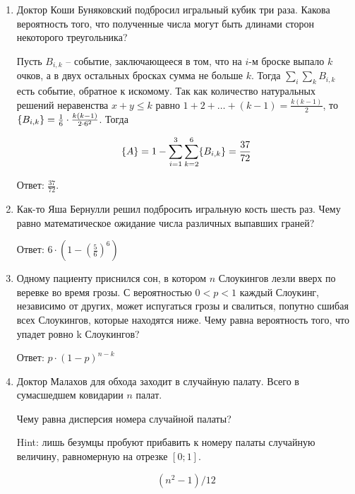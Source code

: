 \documentclass[12pt]{article}
\let\P\relax
\DeclareMathOperator{\P}{\mathbb{P}}
\newenvironment{solution}{}{}
\begin{document}
\begin{enumerate}
    \item Доктор Коши Буняковский подбросил игральный кубик три раза. Какова вероятность того, что полученные числа могут быть длинами сторон некоторого треугольника?

\begin{solution}
    Пусть $B_{i,k}$ -- событие, заключающееся в том, что на $i$-м броске выпало $k$ очков, а в двух остальных бросках сумма не больше $k$. Тогда $\sum\limits_{i}\sum\limits_{k}B_{i,k}$ есть событие, обратное к искомому. Так как количество натуральных решений неравенства $x+y \leq k$ равно $1+2+ \ldots + (k-1) = \frac{k(k-1)}{2}$, то $\P\{B_{i,k}\} = \frac{1}{6} \cdot \frac{k(k-1)}{2 \cdot 6^2}$. Тогда
    
    $$\P\{A\} = 1 - \sum\limits_{i=1}^3\sum\limits_{k=2}^6\P\{B_{i,k}\} = \frac{37}{72}$$
    
    Ответ: $\frac{37}{72}$.
\end{solution}    

    \item Как-то Яша Бернулли решил подбросить игральную кость шесть раз. Чему равно математическое ожидание числа различных выпавших граней? 
    
\begin{solution}
    Ответ: $6 \cdot \left(1 - (\frac{5}{6})^6\right)$
\end{solution}
    
    \item Одному пациенту приснился сон, в котором $n$ Слоукингов лезли вверх по веревке во время грозы. С вероятностью $0 < p < 1$ каждый Слоукинг, независимо от других, может испугаться грозы и свалиться, попутно сшибая всех Слоукингов, которые находятся ниже. Чему равна вероятность того, что упадет ровно k Слоукингов?
    
\begin{solution}
    Ответ: $p \cdot (1 - p)^{n - k}$
\end{solution}
    
    \item Доктор Малахов для обхода заходит в случайную палату. Всего в сумасшедшем ковидарии $n$ палат. 
    
    Чему равна дисперсия номера случайной палаты?
    
    Hint: лишь безумцы пробуют прибавить к номеру палаты случайную величину, равномерную на отрезке $[0;1]$.
    
\begin{solution}
    \[
    (n^2 - 1)/12
    \]
\end{solution}
    
    
\end{enumerate}
\end{document}
